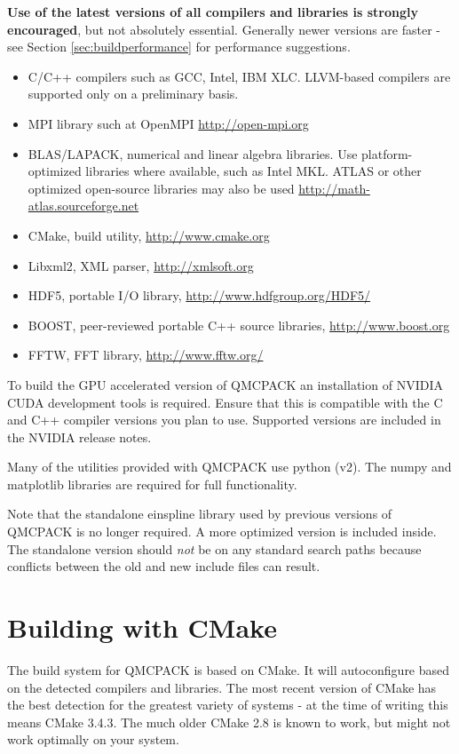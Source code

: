 \textbf{Use of the latest versions of all compilers and libraries is
strongly encouraged}, but not absolutely essential. Generally newer versions are faster - see
Section \ref{sec:buildperformance} for performance suggestions.

\begin{itemize}
\item C/C++ compilers such as GCC, Intel, IBM XLC. LLVM-based compilers
  are supported only on a preliminary basis.
\item MPI library such at OpenMPI \url{http://open-mpi.org}
\item BLAS/LAPACK, numerical and linear algebra libraries. Use
  platform-optimized libraries where available, such as Intel MKL.
  ATLAS or other optimized open-source libraries may also be used
  \url{http://math-atlas.sourceforge.net}
\item CMake, build utility, \url{http://www.cmake.org}
\item Libxml2, XML parser, \url{http://xmlsoft.org}
\item HDF5, portable I/O library, \url{http://www.hdfgroup.org/HDF5/}
\item BOOST, peer-reviewed portable C++ source libraries, \url{http://www.boost.org}
\item FFTW, FFT library, \url{http://www.fftw.org/}
\end{itemize}

To build the GPU accelerated version of QMCPACK an installation of
NVIDIA CUDA development tools is required. Ensure that this is
compatible with the C and C++ compiler versions you plan to
use. Supported versions are included in the NVIDIA release notes.

Many of the utilities provided with QMCPACK use python (v2). The numpy
and matplotlib libraries are required for full functionality.

Note that the standalone einspline library used by previous versions of QMCPACK
is no longer required. A more optimized version is included
inside. The standalone version should \emph{not} be on any standard
search paths because conflicts between the old and new include files
can result.

\section{Building with CMake}
\label{sec:cmake}
The build system for QMCPACK is based on CMake.  It will autoconfigure
based on the detected compilers and libraries. The most recent
version of CMake has the best detection for the greatest variety of
systems - at the time of writing this means CMake 3.4.3. The much
older CMake 2.8 is known to work, but might not work optimally on your system.

